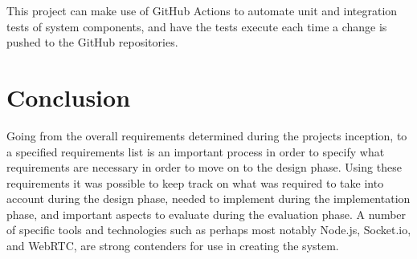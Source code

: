 This project can make use of GitHub Actions to automate unit and integration tests of system components, and have the tests execute each time a change is pushed to the GitHub repositories.

\section{Conclusion}
Going from the overall requirements determined during the projects inception, to a specified requirements list is an important process in order to specify what requirements are necessary in order to move on to the design phase. Using these requirements it was possible to keep track on what was required to take into account during the design phase, needed to implement during the implementation phase, and important aspects to evaluate during the evaluation phase. A number of specific tools and technologies such as perhaps most notably Node.js, Socket.io, and WebRTC, are strong contenders for use in creating the system.